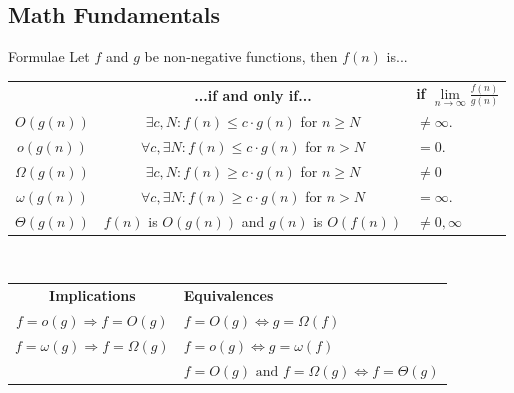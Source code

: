 \documentclass[10pt,a4paper]{article}
\begin{document}
\small
\begin{multicols}{3}

    \scriptsize

    \section{Math Fundamentals}
    \begin{textbox}{Formulae}
         Let $f$ and $g$ be non-negative functions, then $f(n)$ is...\\

        \begin{tabular}{c|c|p{}}
                           & {\bf...if and only if...}                            & {\bf if $\lim\limits_{n \to \infty} \frac{f(n)}{g(n)}$} \\
            $O(g(n))$      & $\exists c,N:f(n)\leq c\cdot g(n)$ for $n\geq N$     & $\neq \infty$.                                          \\
            $o(g(n))$      & $\forall c,\exists N:f(n)\leq c\cdot g(n)$ for $n>N$ & $= 0$.                                                  \\
            $\Omega(g(n))$ & $\exists c,N:f(n)\geq c\cdot g(n)$ for $n\geq N$     & $\neq 0$                                                \\
            $\omega(g(n))$ & $\forall c,\exists N:f(n)\geq c\cdot g(n)$ for $n>N$ & $= \infty$.                                             \\
            $\Theta(g(n))$ & $f(n)$ is $O(g(n))$ and $g(n)$ is $O(f(n))$          & $\neq 0, \infty$                                        \\
        \end{tabular}\\
        \linebreak
        \begin{tabular}{c|p{}}
            {\bf Implications}                        & {\bf Equivalences}                                                  \\
            $f = o(g) \Rightarrow f = O(g)$           & $f = O(g) \Leftrightarrow g = \Omega(f)$                            \\
            $f = \omega(g) \Rightarrow f = \Omega(g)$ & $f = o(g) \Leftrightarrow g = \omega(f)$                            \\
                                                      & $f = O(g) \text{ and } f = \Omega(g) \Leftrightarrow f = \Theta(g)$ \\

\end{tabular}
\end{textbox}
\end{multicols}
\end{document}
